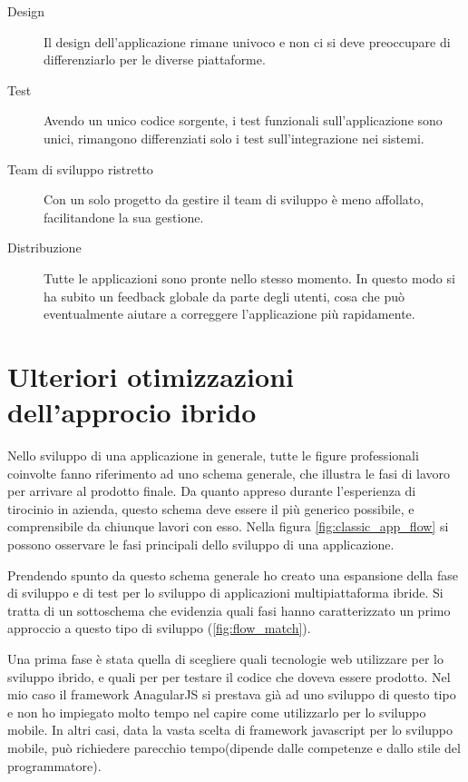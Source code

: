 \begin{description}
	\item[Design] Il design dell'applicazione rimane univoco e non ci si deve preoccupare di differenziarlo per le diverse piattaforme.
	\item[Test] Avendo un unico codice sorgente, i test funzionali sull'applicazione sono unici, rimangono differenziati solo i test sull'integrazione nei sistemi.
	\item[Team di sviluppo ristretto] Con un solo progetto da gestire il team di sviluppo è meno affollato, facilitandone la sua gestione.
	\item[Distribuzione] Tutte le applicazioni sono pronte nello stesso momento. In questo modo si ha subito un feedback globale da parte degli utenti, cosa che può eventualmente aiutare a correggere l'applicazione più rapidamente.
\end{description}

\section{Ulteriori otimizzazioni dell'approcio ibrido}

Nello sviluppo di una applicazione in generale, tutte le figure professionali coinvolte fanno riferimento ad uno schema generale, che illustra le fasi di lavoro per arrivare al prodotto finale. Da quanto appreso durante l'esperienza di tirocinio in azienda, questo schema deve essere il più generico possibile, e comprensibile da chiunque lavori con esso. Nella figura \ref{fig:classic_app_flow} si possono osservare le fasi principali dello sviluppo di una applicazione.

Prendendo spunto da questo schema generale ho creato una espansione della fase di sviluppo e di test per lo sviluppo di applicazioni multipiattaforma ibride. Si tratta di un sottoschema che evidenzia quali fasi hanno caratterizzato un primo approccio a questo tipo di sviluppo (\ref{fig:flow_match}).

Una prima fase è stata quella di scegliere quali tecnologie web utilizzare per lo sviluppo ibrido, e quali per per testare il codice che doveva essere prodotto. Nel mio caso il framework AnagularJS si prestava già ad uno sviluppo di questo tipo e non ho impiegato molto tempo nel capire come utilizzarlo per lo sviluppo mobile. In altri casi, data la vasta scelta di framework javascript per lo sviluppo mobile, può richiedere parecchio tempo(dipende dalle competenze e dallo stile del programmatore).

